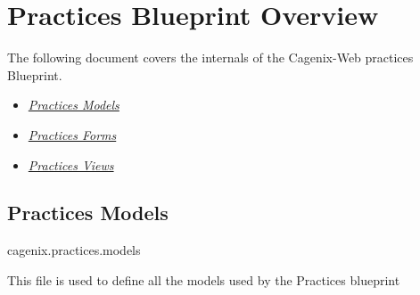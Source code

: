 \documentclass[letterpaper,10pt,english]{sphinxmanual}
\begin{document}
\chapter{Practices Blueprint Overview}
\label{dev-practices:practices-blueprint-overview}\label{dev-practices::doc}
The following document covers the internals of the Cagenix-Web practices
Blueprint.
\begin{itemize}
\item {} 
{\hyperref[dev-practices:practices-models-label]{\emph{Practices Models}}}

\item {} 
{\hyperref[dev-practices:practices-forms-label]{\emph{Practices Forms}}}

\item {} 
{\hyperref[dev-practices:practices-views-label]{\emph{Practices Views}}}

\end{itemize}


\section{Practices Models}
\label{dev-practices:practices-models-label}\label{dev-practices:module-cagenix.practices.models}\label{dev-practices:practices-models}
cagenix.practices.models

This file is used to define all the models used by the Practices blueprint
\end{document}
